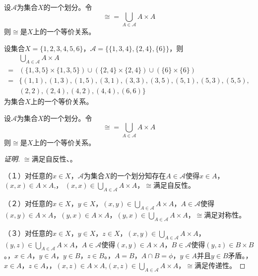\documentclass{beamer}
\begin{document}
\begin{CJK*}{UTF8}{gbsn}
\begin{frame}
\end{frame}
\begin{frame}
  \begin{Thm}
    设$\mathscr{A}$为集合$X$的一个划分。令
    \begin{equation*}
      \cong = \bigcup_{A\in \mathscr{A}}A\times A
    \end{equation*}
    则$\cong$是$X$上的一个等价关系。
  \end{Thm}
  \pause
  设集合$X=\{1,2,3,4,5,6\}$，$\mathscr{A}=\{\{1,3,4\},\{2,4\},\{6\}\}$，则
  \begin{equation*}
    \begin{split}
      &\bigcup_{A\in \mathscr{A}}A\times A\\
      =&(\{1,3,5\} \times \{1,3,5\}) \cup (\{2,4\}\times \{2,4\}) \cup (\{6\}\times \{6\})\\
      =&\{(1,1),(1,3),(1,5),(3,1),(3,3),(3,5),(5,1),(5,3),(5,5),\\
      &(2,2),(2,4),(4,2),(4,4),(6,6)\}
    \end{split}
  \end{equation*}
  为集合$X$上的一个等价关系。

\end{frame}

\begin{frame}
  \small
  \begin{Thm6.3}
    设$\mathscr{A}$为集合$X$的一个划分。令
    \begin{equation*}
      \cong = \bigcup_{A\in \mathscr{A}}A\times A
    \end{equation*}
    则$\cong$是$X$上的一个等价关系。
  \end{Thm6.3}
  \pause
  \begin{proof}[证明]\justifying\let\raggedright\justifying
    $\cong$满足自反性、。

    \pause（１）对任意的$x\in X$，$\mathscr{A}$为集合$X$的一个划分知存在$A\in \mathscr{A}$使得$x\in A$，$(x,x) \in A\times A$,， \pause$(x,x)\in \bigcup_{A\in \mathscr{A}}A\times A$，$\cong$满足自反性。

    \pause（２）对任意的$x\in X$，\pause$y\in X$，$(x,y)\in \bigcup_{A\in \mathscr{A}}A\times A$，$A\in \mathscr{A}$使得$(x,y)\in A\times A$，$(y,x)\in A\times A$，$(y,x)\in \bigcup_{A\in \mathscr{A}}A\times A$，$\cong$满足对称性。

  \pause  （３）对任意的$x\in X$，\pause$y\in X$，\pause$z\in X$，$(x,y)\in \bigcup_{A\in \mathscr{A}}A\times A$，$(y,z)\in \bigcup_{A\in \mathscr{A}}A\times A$，$A\in \mathscr{A}$使得$(x,y)\in A\times A$，$B\in \mathscr{A}$使得$(y,z)\in B\times B$。，\pause$x\in A$，\pause$y\in A$，\pause$y\in B$，\pause$z\in B$。，$A=B$，$A\cap B=\phi$，$y\in A$并且$y\in B$矛盾。，\pause$x\in A$，\pause$z\in A$，，\pause$(x,z)\in A\times A$,$(x,z)\in \bigcup_{A\in \mathscr{A}}A\times A$，$\cong$满足传递性。
    

\end{proof}
\end{frame}
\end{CJK*}
\end{document}
